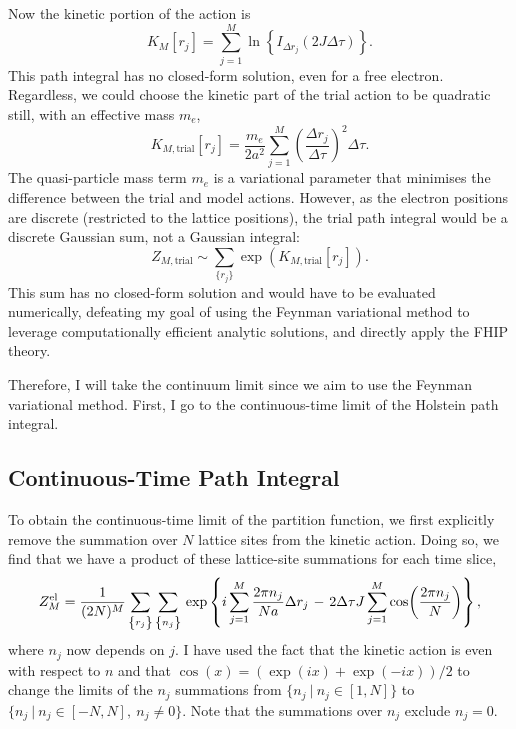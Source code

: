 Now the kinetic portion of the action is 
\begin{equation}
    K_M[r_j] = \sum_{j=1}^M \ln\left\{I_{\Delta r_j}(2J\Delta\tau)\right\}.
\end{equation}
This path integral has no closed-form solution, even for a free electron. Regardless, we could choose the kinetic part of the trial action to be quadratic still, with an effective mass $m_e$, 
\begin{equation}
    K_{M,\text{trial}}[r_j] = \frac{m_e}{2 a^2} \sum_{j=1}^M \left(\frac{\Delta
    r_j}{\Delta\tau}\right)^2 \Delta \tau .
\end{equation}
The quasi-particle mass term $m_e$ is a variational parameter that minimises the difference between the trial and model actions. However, as the electron positions are discrete (restricted to the lattice positions), the trial path integral would be a discrete Gaussian sum, not a Gaussian integral:
\begin{equation}
    Z_{M,\text{trial}} \sim \sum_{\{r_j\}} \exp\left(K_{M,\text{trial}}[r_j]\right).
\end{equation}
This sum has no closed-form solution and would have to be evaluated numerically, defeating my goal of using the Feynman variational method to
leverage computationally efficient analytic solutions, and directly apply the FHIP theory. 

Therefore, I will take the continuum limit since we aim to use the Feynman variational method. First, I go to the continuous-time limit of the Holstein path integral.

\subsection{Continuous-Time Path Integral}
\label{subsec:3-2-2}

To obtain the continuous-time limit of the partition function, we first
explicitly remove the summation over $N$ lattice sites from the kinetic action. Doing so, we find that we have a product of these lattice-site summations for each time slice,
\begin{equation}
    Z^{\text{el}}_M = \frac{1}{(2N)^M} \sum_{\left\{r_j\right\}} \sum_{\left\{n_j\right\}} \\
    \exp\left\{i \sum_{j=1}^M \frac{2 \pi n_j}{N a} \Delta r_j \right. 
    - \left. 2 \Delta\tau J \sum_{j=1}^M \cos(\frac{2 \pi n_j}{N})\right\} ,
\end{equation}
where $n_j$ now depends on $j$. I have used the fact that the kinetic action is even with respect to $n$ and that $\cos(x) = (\exp(ix) + \exp(-ix))/2$ to change the limits of the $n_j$ summations from $\{n_j\ |\ n_j \in [1, N]\}$ to $\{n_j\ |\ n_j \in [-N, N],\ n_j \neq 0 \}$. Note that the summations over $n_j$ exclude $n_j = 0$. 


